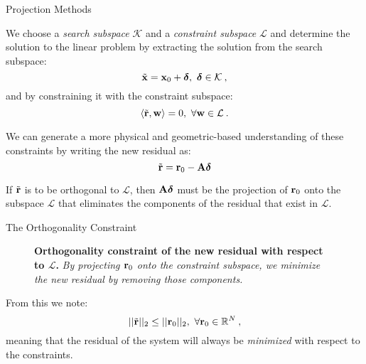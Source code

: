 \documentclass{beamer}
\begin{document}
\begin{frame}{Projection Methods}

  We choose a \textit{search subspace} $\mathcal{K}$ and a
  \textit{constraint subspace} $\mathcal{L}$ and determine the solution
  to the linear problem by extracting the solution from the search
  subspace:
  \[
  \tilde{\mathbf{x}} = \mathbf{x}_0 +
  \boldsymbol{\delta},\ \boldsymbol{\delta} \in \mathcal{K}\:,
  \]
  and by constraining it with the constraint subspace:
  \[
  \langle \tilde{\ve{r}},\ve{w} \rangle = 0,\ \forall \ve{w} \in
  \mathcal{L}\:.
  \]

  We can generate a more physical and geometric-based understanding of
  these constraints by writing the new residual as:
  \[
  \tilde{\mathbf{r}} = \mathbf{r}_0 - \mathbf{A}\boldsymbol{\delta}
  \]

  If $\tilde{\mathbf{r}}$ is to be orthogonal to $\mathcal{L}$, then
  $\mathbf{A}\boldsymbol{\delta}$ must be the projection of $\mathbf{r}_0$
  onto the subspace $\mathcal{L}$ that eliminates the components of
  the residual that exist in $\mathcal{L}$.

\end{frame}

\begin{frame}{The Orthogonality Constraint}

  \begin{figure}[htpb!]
    \begin{center}
      \scalebox{1.25}{
         }
    \end{center}
    \caption{\textbf{Orthogonality constraint of the new residual with
        respect to $\mathcal{L}$.} \textit{By projecting $\mathbf{r}_0$ onto
        the constraint subspace, we minimize the new residual by
        removing those components.}}
    \label{fig:linear_projection_constraint}
  \end{figure}

  From this we note:
  \[
  ||\tilde{\mathbf{r}}||_2 \leq ||\mathbf{r}_0||_2,\ \forall \mathbf{r}_0 \in
  \mathbb{R}^N\:,
  \]
  meaning that the residual of the system will always be
  \textit{minimized} with respect to the constraints.

\end{frame}
\end{document}
